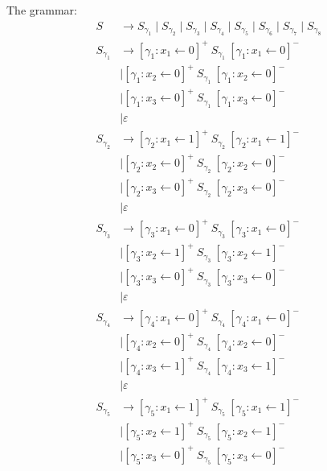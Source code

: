 The grammar:
\begin{align*}
S & \to S_{\gamma_1} \mid S_{\gamma_2} \mid S_{\gamma_3} \mid S_{\gamma_4} \mid S_{\gamma_5} \mid S_{\gamma_6} \mid S_{\gamma_7} \mid S_{\gamma_8} \\
S_{\gamma_1} & \to  [\gamma_1:x_1 \leftarrow 0]^+ \ S_{\gamma_1} \ [\gamma_1:x_1 \leftarrow 0]^- \\
             & \mid [\gamma_1:x_2 \leftarrow 0]^+ \ S_{\gamma_1} \ [\gamma_1:x_2 \leftarrow 0]^- \\ 
             & \mid [\gamma_1:x_3 \leftarrow 0]^+ \ S_{\gamma_1} \ [\gamma_1:x_3 \leftarrow 0]^- \\ 
             & \mid \varepsilon \\
S_{\gamma_2} & \to  [\gamma_2:x_1 \leftarrow 1]^+ \ S_{\gamma_2} \ [\gamma_2:x_1 \leftarrow 1]^- \\
             & \mid [\gamma_2:x_2 \leftarrow 0]^+ \ S_{\gamma_2} \ [\gamma_2:x_2 \leftarrow 0]^- \\ 
             & \mid [\gamma_2:x_3 \leftarrow 0]^+ \ S_{\gamma_2} \ [\gamma_2:x_3 \leftarrow 0]^- \\ 
             & \mid \varepsilon \\
S_{\gamma_3} & \to  [\gamma_3:x_1 \leftarrow 0]^+ \ S_{\gamma_3} \ [\gamma_3:x_1 \leftarrow 0]^- \\
             & \mid [\gamma_3:x_2 \leftarrow 1]^+ \ S_{\gamma_3} \ [\gamma_3:x_2 \leftarrow 1]^- \\ 
             & \mid [\gamma_3:x_3 \leftarrow 0]^+ \ S_{\gamma_3} \ [\gamma_3:x_3 \leftarrow 0]^- \\ 
             & \mid \varepsilon \\ 
S_{\gamma_4} & \to  [\gamma_4:x_1 \leftarrow 0]^+ \ S_{\gamma_4} \ [\gamma_4:x_1 \leftarrow 0]^- \\
             & \mid [\gamma_4:x_2 \leftarrow 0]^+ \ S_{\gamma_4} \ [\gamma_4:x_2 \leftarrow 0]^- \\ 
             & \mid [\gamma_4:x_3 \leftarrow 1]^+ \ S_{\gamma_4} \ [\gamma_4:x_3 \leftarrow 1]^- \\ 
             & \mid \varepsilon \\
S_{\gamma_5} & \to  [\gamma_5:x_1 \leftarrow 1]^+ \ S_{\gamma_5} \ [\gamma_5:x_1 \leftarrow 1]^- \\
             & \mid [\gamma_5:x_2 \leftarrow 1]^+ \ S_{\gamma_5} \ [\gamma_5:x_2 \leftarrow 1]^- \\ 
             & \mid [\gamma_5:x_3 \leftarrow 0]^+ \ S_{\gamma_5} \ [\gamma_5:x_3 \leftarrow 0]^- \\ 

\end{align*}
